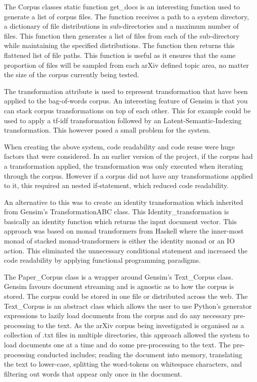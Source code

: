 The Corpus classes static function get\_docs is an interesting function used to generate a list of corpus files.
The function receives a path to a system directory, a dictionary of file distributions in sub-directories and a maximum number of files.
This function then generates a list of files from each of the sub-directory while maintaining the specified distributions.
The function then returns this flattened list of file paths.
This function is useful as it ensures that the same proportion of files will be sampled from each arXiv defined topic area, no matter the size of the corpus currently being tested.

The transformation attribute is used to represent transformation that have been applied to the bag-of-words corpus.
An interesting feature of Gensim is that you can stack corpus transformations on top of each other.
This for example could be used to apply a tf-idf transformation followed by an Latent-Semantic-Indexing transformation.
This however posed a small problem for the system.

When creating the above system, code readability and code reuse were huge factors that were considered.
In an earlier version of the project, if the corpus had a transformation applied, the transformation was only executed when iterating through the corpus.
However if a corpus did not have any transformations applied to it, this required an nested if-statement, which reduced code readability.

An alternative to this was to create an identity transformation which inherited from Gensim's TransformationABC class.
This Identity\_transformation is basically an identity function which returns the input document vector.
This approach was based on monad transformers from Haskell where the inner-most monad of stacked monad-transformers is either the identity monad or an IO action.
This eliminated the unnecessary conditional statement and increased the code readability by applying functional programming paradigms.

The Paper\_Corpus class is a wrapper around Gensim's Text\_Corpus class.
Gensim favours document streaming and is agnostic as to how the corpus is stored.
The corpus could be stored in one file or distributed across the web.
The Text\_Corpus is an abstract class which allows the user to use Python's generator expressions to lazily load documents from the corpus and do any necessary pre-processing to the text.
As the arXiv corpus being investigated is organised as a collection of .txt files in multiple directories, this approach allowed the system to load documents one at a time and do some pre-processing to the text.
The pre-processing conducted includes; reading the document into memory, translating the text to lower-case, splitting the word-tokens on whitespace characters, and filtering out words that appear only once in the document.

